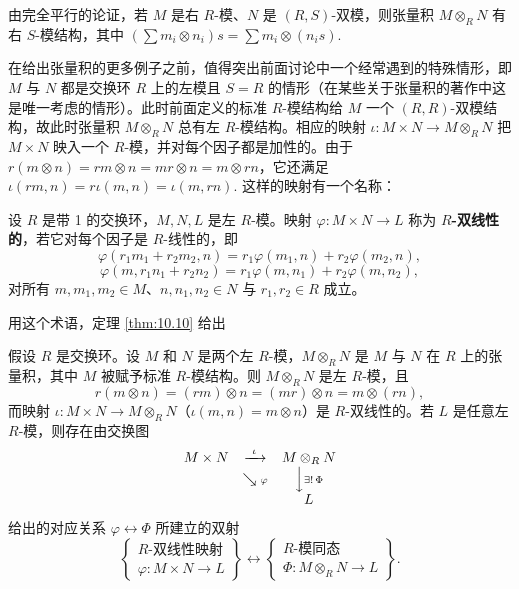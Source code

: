 由完全平行的论证，若 \(M\) 是右 \(R\)-模、\(N\) 是 \((R, S)\)-双模，则张量积 \(M \otimes_R N\) 有右 \(S\)-模结构，其中 \((\sum m_i \otimes n_i)s = \sum m_i \otimes (n_is)\).

在给出张量积的更多例子之前，值得突出前面讨论中一个经常遇到的特殊情形，即 \(M\) 与 \(N\) 都是交换环 \(R\) 上的左模且 \(S = R\) 的情形（在某些关于张量积的著作中这是唯一考虑的情形）。此时前面定义的标准 \(R\)-模结构给 \(M\) 一个 \((R, R)\)-双模结构，故此时张量积 \(M \otimes_R N\) 总有左 \(R\)-模结构。相应的映射 \(\iota : M \times N \to M \otimes_R N\) 把 \(M \times N\) 映入一个 \(R\)-模，并对每个因子都是加性的。由于 \(r(m \otimes n) = rm \otimes n = mr \otimes n = m \otimes rn\)，它还满足 \(\iota(rm, n) = r\iota(m, n) = \iota(m, rn)\). 这样的映射有一个名称：

\begin{definition}
设 \(R\) 是带 1 的交换环，\(M, N, L\) 是左 \(R\)-模。映射 \(\varphi : M \times N \to L\) 称为 \textbf{\(R\)-双线性的}，若它对每个因子是 \(R\)-线性的，即
\[
\varphi(r_1m_1+r_2m_2, n) = r_1\varphi(m_1, n)+r_2\varphi(m_2, n),
\]
\[
\varphi(m, r_1n_1+r_2n_2) = r_1\varphi(m, n_1)+r_2\varphi(m, n_2),
\]
对所有 \(m, m_1, m_2 \in M\)、\(n, n_1, n_2 \in N\) 与 \(r_1, r_2 \in R\) 成立。
\end{definition}

用这个术语，定理 \ref{thm:10.10} 给出

\begin{corollary}\label{cor:10.12}
假设 \(R\) 是交换环。设 \(M\) 和 \(N\) 是两个左 \(R\)-模，\(M \otimes_R N\) 是 \(M\) 与 \(N\) 在 \(R\) 上的张量积，其中 \(M\) 被赋予标准 \(R\)-模结构。则 \(M \otimes_R N\) 是左 \(R\)-模，且
\[
r(m \otimes n) = (rm) \otimes n = (mr) \otimes n = m \otimes (rn),
\]
而映射 \(\iota : M \times N \to M \otimes_R N\)（\(\iota(m, n) = m \otimes n\)）是 \(R\)-双线性的。若 \(L\) 是任意左 \(R\)-模，则存在由交换图
\[
\begin{array}{ccc}
M \times N & \xrightarrow{\ \iota\ } & M \otimes_R N \\
& \searrow{\scriptstyle \varphi} & \Big\downarrow{\scriptstyle \exists!\,\Phi} \\
& & L
\end{array}
\]
给出的对应关系 \(\varphi \leftrightarrow \Phi\) 所建立的双射
\[
\left\{\begin{array}{c} R\text{-双线性映射} \\ \varphi : M \times N \to L\end{array}\right\}
\longleftrightarrow
\left\{\begin{array}{c} R\text{-模同态} \\ \Phi : M \otimes_R N \to L\end{array}\right\}.
\]
\end{corollary}

